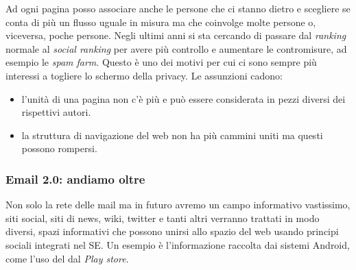 					Ad ogni pagina posso associare anche le persone che ci stanno dietro e scegliere se conta di più un flusso uguale in misura ma che coinvolge molte persone o, viceversa, poche persone. Negli ultimi anni si sta cercando di passare dal \emph{ranking} normale al \emph{social ranking} per avere più controllo e aumentare le contromisure, ad esempio le \emph{spam farm}. Questo è uno dei motivi per cui ci sono sempre più interessi a togliere lo schermo della privacy.
					Le assunzioni cadono:
					\begin{itemize}
						\item l'unità di una pagina non c'è più e può essere considerata in pezzi diversi dei rispettivi autori.
						\item la struttura di navigazione del web non ha più cammini uniti ma questi possono rompersi.
					\end{itemize}
					
				\subsubsection{Email 2.0: andiamo oltre}
					Non solo la rete delle mail ma in futuro avremo un campo informativo vastissimo, siti social, siti di news, wiki, twitter e tanti altri verranno trattati in modo diversi, spazi informativi che possono unirsi allo spazio del web usando principi sociali integrati nel SE. Un esempio è l'informazione raccolta dai sistemi Android, come l'uso del dal \emph{Play store}.